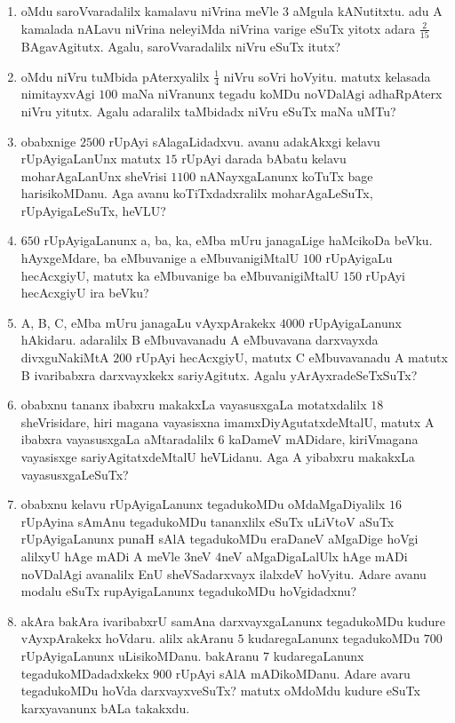 \begin{enumerate}[\rm(1)]
\item oMdu saroVvaradalilx kamalavu niVrina meVle $3$ aMgula kANutitxtu. adu A kamalada nALavu niVrina neleyiMda niVrina varige eSuTx yitotx adara $\tfrac{2}{15}$ BAgavAgitutx. Agalu, saroVvaradalilx niVru eSuTx itutx?

\item oMdu niVru tuMbida pAterxyalilx $\tfrac{1}{4}$ niVru soVri hoVyitu. matutx kelasada nimitayxvAgi $100$ maNa niVranunx tegadu koMDu noVDalAgi adhaRpAterx niVru yitutx. Agalu adaralilx taMbidadx niVru eSuTx maNa uMTu?

\item obabxnige $2500$ rUpAyi sAlagaLidadxvu. avanu adakAkxgi kelavu rUpAyigaLanUnx matutx $15$ rUpAyi darada bAbatu kelavu moharAgaLanUnx sheVrisi $1100$ nANayxgaLanunx koTuTx bage harisikoMDanu. Aga avanu koTiTxdadxralilx moharAgaLeSuTx, rUpAyigaLeSuTx, heVLU?

\item $650$ rUpAyigaLanunx a, ba, ka, eMba mUru janagaLige haMcikoDa beVku. hAyxgeMdare, ba eMbuvanige a eMbuvanigiMtalU $100$ rUpAyigaLu hecAcxgiyU, matutx ka eMbuvanige ba eMbuvanigiMtalU $150$ rUpAyi hecAcxgiyU ira beVku?

\item {\rm A, B, C,} eMba mUru janagaLu vAyxpArakekx $4000$ rUpAyigaLanunx hAkidaru. adaralilx {\rm B} eMbuvavanadu {\rm A} eMbuvavana darxvayxda divxguNakiMtA $200$ rUpAyi hecAcxgiyU, matutx {\rm C} eMbuvavanadu {\rm A} matutx {\rm B} ivaribabxra darxvayxkekx sariyAgitutx. Agalu yArAyxradeSeTxSuTx?

\item obabxnu tananx ibabxru makakxLa vayasusxgaLa motatxdalilx $18$ sheVrisidare, hiri magana vayasisxna imamxDiyAgutatxdeMtalU, matutx A ibabxra vayasusxgaLa aMtaradalilx $6$ kaDameV mADidare, kiriVmagana vayasisxge sariyAgitatxdeMtalU heVLidanu. Aga A yibabxru makakxLa vayasusxgaLeSuTx?

\item obabxnu kelavu rUpAyigaLanunx tegadukoMDu oMdaMgaDiyalilx $16$ rUpAyina sAmAnu tegadukoMDu tananxlilx eSuTx uLiVtoV aSuTx rUpAyigaLanunx punaH sAlA tegadukoMDu eraDaneV aMgaDige hoVgi alilxyU hAge mADi A meVle $3$neV $4$neV aMgaDigaLalUlx hAge mADi noVDalAgi avanalilx EnU sheVSadarxvayx ilalxdeV hoVyitu. Adare avanu modalu eSuTx rupAyigaLanunx tegadukoMDu hoVgidadxnu?

\item akAra bakAra ivaribabxrU samAna darxvayxgaLanunx tegadukoMDu kudure vAyxpArakekx hoVdaru. alilx akAranu $5$ kudaregaLanunx tegadukoMDu $700$ rUpAyigaLanunx uLisikoMDanu. bakAranu $7$ kudaregaLanunx tegadukoMDadadxkekx $900$ rUpAyi sAlA mADikoMDanu. Adare avaru tegadukoMDu hoVda darxvayxveSuTx? matutx oMdoMdu kudure eSuTx karxyavanunx bALa takakxdu.


\end{enumerate}
